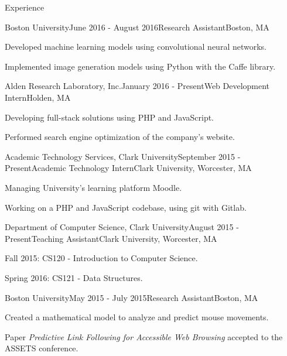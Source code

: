 \documentclass{resume} %
\begin{document}
\begin{rSection}{Experience}


\begin{rSubsection}{Boston University}{June 2016 - August 2016}{Research Assistant}{Boston, MA}
\item Developed machine learning models using convolutional neural networks.
\item Implemented image generation models using Python with the Caffe library.
\end{rSubsection}


\begin{rSubsection}{Alden Research Laboratory, Inc.}{January 2016 - Present}{Web Development Intern}{Holden, MA}
\item Developing full-stack solutions using PHP and JavaScript.
\item Performed search engine optimization of the company's website.
\end{rSubsection}


\begin{rSubsection}{Academic Technology Services, Clark University}{September 2015 - Present}{Academic Technology Intern}{Clark University, Worcester, MA}
\item Managing University's learning platform Moodle.
\item Working on a PHP and JavaScript codebase, using git with Gitlab.
\end{rSubsection}


\begin{rSubsection}{Department of Computer Science, Clark University}{August 2015 - Present}{Teaching Assistant}{Clark University, Worcester, MA}
\item Fall 2015: CS120 - Introduction to Computer Science.
\item Spring 2016: CS121 - Data Structures.
\end{rSubsection}


\begin{rSubsection}{Boston University}{May 2015 - July 2015}{Research Assistant}{Boston, MA}
\item Created a mathematical model to analyze and predict mouse movements.
\item Paper \emph{Predictive Link Following for Accessible Web Browsing} accepted to the ASSETS conference.
\end{rSubsection}


\end{rSection}
\end{document}
